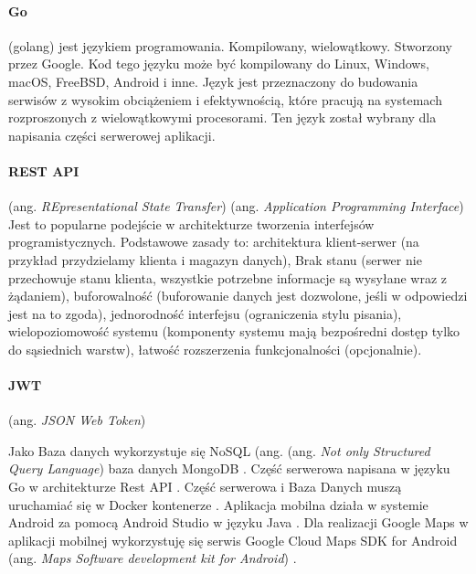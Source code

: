 \paragraph{Go} (golang) \cite{golang1,golang2,golang3,godoc} jest językiem programowania. Kompilowany, wielowątkowy. Stworzony przez Google. Kod tego języku może być kompilowany do Linux, Windows, macOS, FreeBSD, Android i inne.
Język jest przeznaczony do budowania serwisów z wysokim obciążeniem i efektywnością, które pracują na systemach rozproszonych z wielowątkowymi procesorami. Ten język został wybrany dla napisania części serwerowej aplikacji.

\paragraph{REST API} (ang. \textit{REpresentational State Transfer}) (ang. \textit{Application Programming Interface}) \cite{rest_api,rest_api_best} Jest to popularne podejście w architekturze tworzenia interfejsów programistycznych.
Podstawowe zasady to: architektura klient-serwer (na przykład przydzielamy klienta i magazyn danych), Brak stanu (serwer nie przechowuje stanu klienta, wszystkie potrzebne informacje są wysyłane wraz z żądaniem),
buforowalność (buforowanie danych jest dozwolone, jeśli w odpowiedzi jest na to zgoda), jednorodność interfejsu (ograniczenia stylu pisania), wielopoziomowość systemu (komponenty systemu mają bezpośredni dostęp tylko do sąsiednich warstw), łatwość rozszerzenia funkcjonalności (opcjonalnie).

\paragraph{JWT} (ang. \textit{JSON Web Token}) \cite{jwt}

Jako Baza danych wykorzystuje się NoSQL (ang. (ang. \textit{Not only Structured Query Language}) baza danych MongoDB \cite{mongoDB,mongoDB_doc}.
Część serwerowa napisana w języku Go \cite{golang1,golang2,golang3,godoc} w architekturze Rest API \cite{rest_api_best}.
Część serwerowa i Baza Danych muszą uruchamiać się w Docker kontenerze \cite{docker,docker_doc}.
Aplikacja mobilna działa w systemie Android za pomocą Android Studio \cite{android_doc,android_studio,gradle,gradle_android_doc} w języku Java \cite{java_doc}.
Dla realizacji Google Maps w aplikacji mobilnej wykorzystuję się serwis Google Cloud \cite{google_cloud} Maps SDK for Android (ang. \textit{Maps Software development kit for Android}) \cite{maps_sdk}.

